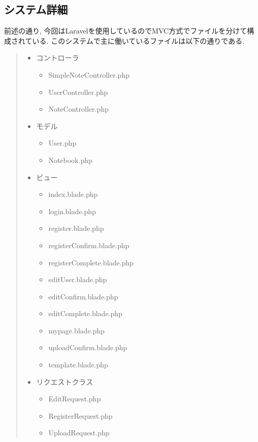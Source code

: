 \documentclass[submit,techrep]{ipsj}
\begin{document}
\subsection{システム詳細}
前述の通り, 今回はLaravelを使用しているのでMVC方式でファイルを分けて構成されている. このシステムで主に働いているファイルは以下の通りである. 

\begin{quote}
 \begin{itemize}
  \item コントローラ
   \begin{itemize}
   \item SimpleNoteController.php
   \item UserController.php
   \item NoteController.php
   \end{itemize}
  \item モデル
   \begin{itemize}
    \item User.php
    \item Notebook.php
   \end{itemize}
  \item ビュー
   \begin{itemize}
    \item index.blade.php
    \item login.blade.php
    \item register.blade.php
    \item registerConfirm.blade.php
    \item registerComplete.blade.php
    \item editUser.blade.php
    \item editConfirm.blade.php
    \item editComplete.blade.php
    \item mypage.blade.php
    \item uploadConfirm.blade.php
    \item template.blade.php
   \end{itemize}
   \item リクエストクラス
   \begin{itemize}
    \item EditRequest.php
    \item RegisterRequest.php
    \item UploadRequest.php
   \end{itemize}
 \end{itemize}
\end{quote}
\end{document}
